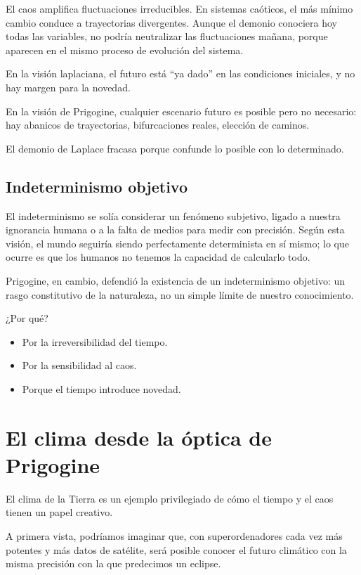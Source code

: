 \documentclass[
  10pt,
  a4paper,
  DIV=11,
  numbers=noendperiod,
  open=any]{scrreprt}
\numberwithin{equation}{chapter}
\numberwithin{equation}{section}
\renewcommand{\[}{\begin{equation}}
\renewcommand{\]}{\end{equation}}
\begin{document}
El caos amplifica fluctuaciones irreducibles. En sistemas caóticos, el
más mínimo cambio conduce a trayectorias divergentes. Aunque el demonio
conociera hoy todas las variables, no podría neutralizar las
fluctuaciones mañana, porque aparecen en el mismo proceso de evolución
del sistema.

En la visión laplaciana, el futuro está ``ya dado'' en las condiciones
iniciales, y no hay margen para la novedad.

En la visión de Prigogine, cualquier escenario futuro es posible pero no
necesario: hay abanicos de trayectorias, bifurcaciones reales, elección
de caminos.

El demonio de Laplace fracasa porque confunde lo posible con lo
determinado.

\section{Indeterminismo objetivo}\label{indeterminismo-objetivo}

El indeterminismo se solía considerar un fenómeno subjetivo, ligado a
nuestra ignorancia humana o a la falta de medios para medir con
precisión. Según esta visión, el mundo seguiría siendo perfectamente
determinista en sí mismo; lo que ocurre es que los humanos no tenemos la
capacidad de calcularlo todo.

Prigogine, en cambio, defendió la existencia de un indeterminismo
objetivo: un rasgo constitutivo de la naturaleza, no un simple límite de
nuestro conocimiento.

¿Por qué?

\begin{itemize}
\item
  Por la irreversibilidad del tiempo.
\item
  Por la sensibilidad al caos.
\item
  Porque el tiempo introduce novedad.
\end{itemize}

\chapter{El clima desde la óptica de
Prigogine}\label{el-clima-desde-la-uxf3ptica-de-prigogine}

El clima de la Tierra es un ejemplo privilegiado de cómo el tiempo y el
caos tienen un papel creativo.

A primera vista, podríamos imaginar que, con superordenadores cada vez
más potentes y más datos de satélite, será posible conocer el futuro
climático con la misma precisión con la que predecimos un eclipse.
\end{document}
